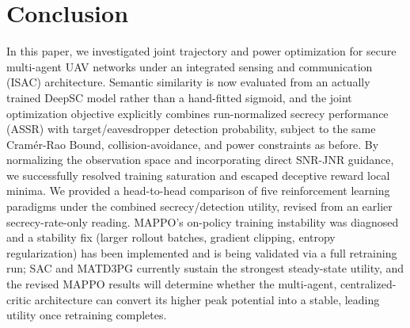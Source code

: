 \documentclass[journal,onecolumn]{IEEEtran}
\begin{document}
\section{Conclusion}
In this paper, we investigated joint trajectory and power optimization for secure multi-agent UAV networks under an integrated sensing and communication (ISAC) architecture. Semantic similarity is now evaluated from an actually trained DeepSC model rather than a hand-fitted sigmoid, and the joint optimization objective explicitly combines run-normalized secrecy performance (ASSR) with target/eavesdropper detection probability, subject to the same Cram\'{e}r-Rao Bound, collision-avoidance, and power constraints as before. By normalizing the observation space and incorporating direct SNR-JNR guidance, we successfully resolved training saturation and escaped deceptive reward local minima. We provided a head-to-head comparison of five reinforcement learning paradigms under the combined secrecy/detection utility, revised from an earlier secrecy-rate-only reading. MAPPO's on-policy training instability was diagnosed and a stability fix (larger rollout batches, gradient clipping, entropy regularization) has been implemented and is being validated via a full retraining run; SAC and MATD3PG currently sustain the strongest steady-state utility, and the revised MAPPO results will determine whether the multi-agent, centralized-critic architecture can convert its higher peak potential into a stable, leading utility once retraining completes.
\end{document}
